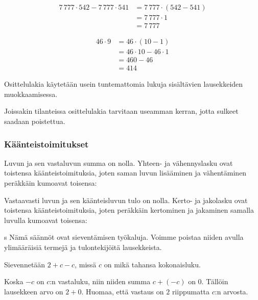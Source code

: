 \begin{esimerkki}
     \begin{align*}
7\,777\cdot 542-7\,777\cdot 541 &= 7\,777\cdot (542-541) \\ &= 7\,777\cdot 1 \\ &= 7\,777
     \end{align*}
\end{esimerkki}

\begin{esimerkki}
    \begin{align*}
46\cdot 9 &= 46\cdot (10-1) \\ &= 46\cdot 10 - 46\cdot 1 \\ &= 460-46 \\ &= 414
    \end{align*}
\end{esimerkki}

Osittelulakia käytetään usein tuntemattomia lukuja sisältävien lausekkeiden muokkaamisessa.

\begin{esimerkki}
\end{esimerkki}

Joissakin tilanteissa osittelulakia tarvitaan useamman kerran, jotta sulkeet saadaan poistettua.

%


\subsubsection*{Käänteistoimitukset}

Luvun ja sen vastaluvun summa on nolla. Yhteen- ja vähennyslasku ovat toistensa käänteistoimituksia, joten saman luvun lisääminen ja vähentäminen peräkkäin kumoavat toisensa:


Vastaavasti luvun ja sen käänteisluvun tulo on nolla. Kerto- ja jakolasku ovat toistensa käänteistoimituksia, joten peräkkäin kertominen ja jakaminen samalla luvulla kumoavat toisensa:

s
Nämä säännöt ovat sieventämisen työkaluja. Voimme poistaa niiden avulla ylimääräisiä termejä ja tulontekijöitä lausekkeista.

\begin{esimerkki} 
    Sievennetään $2+c-c$, missä $c$ on mikä tahansa kokonaisluku.\vspace*{11pt}
   
    Koska $-c$ on $c$:n vastaluku, niin niiden summa $c+(-c)$ on $0$. Tällöin lausekkeen arvo on $2+0$. Huomaa, että vastaus on $2$ riippumatta $c$:n arvosta.
\end{esimerkki}